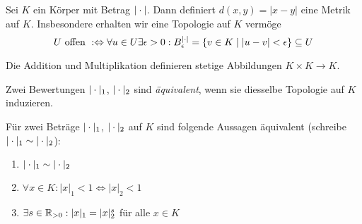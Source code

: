 \documentclass[../main.tex]{subfiles}
\begin{document}
\begin{definition}
    Sei $K$ ein Körper mit Betrag $|\cdot|$.
    Dann definiert $d(x,y)= |x-y|$ eine Metrik auf $K$.
    Insbesondere erhalten wir eine Topologie auf $K$ vermöge 
    $$U\text{ offen }:\Leftrightarrow\forall {u\in U} \exists {\epsilon >0}: B_{\epsilon}^{|\cdot|} = \{v\in K\mid |u-v|<\epsilon\}\subseteq U$$
\end{definition}
\begin{remark}
    Die Addition und Multiplikation definieren stetige Abbildungen $K\times K \rightarrow K$.
\end{remark}
\begin{definition}
    Zwei Bewertungen $|\cdot|_1$, $|\cdot|_2$ sind \emph{äquivalent}, wenn sie diesselbe Topologie auf $K$ induzieren.
\end{definition}
\begin{lemma}
    Für zwei Beträge $|\cdot|_1$, $|\cdot|_2$ auf $K$ sind folgende Aussagen äquivalent (schreibe $|\cdot|_1 \sim|\cdot|_2$):
    \begin{enumerate}[label=\alph*)]
        \item $|\cdot|_1 \sim|\cdot|_2$
        \item $\forall {x\in K}: |x|_1 <1 \Leftrightarrow |x|_2<1$
        \item $\exists {s\in \mathbb{R}_{>0}}: |x|_1 = |x|_2^s$ für alle $x\in K$
    \end{enumerate}
\end{lemma}
\end{document}
